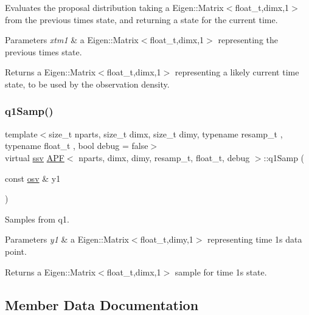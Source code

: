 Evaluates the proposal distribution taking a Eigen\+::\+Matrix$<$float\+\_\+t,dimx,1$>$ from the previous time\textquotesingle{}s state, and returning a state for the current time. 


\begin{DoxyParams}{Parameters}
{\em xtm1} & a Eigen\+::\+Matrix$<$float\+\_\+t,dimx,1$>$ representing the previous time\textquotesingle{}s state. \\
\hline
\end{DoxyParams}
\begin{DoxyReturn}{Returns}
a Eigen\+::\+Matrix$<$float\+\_\+t,dimx,1$>$ representing a likely current time state, to be used by the observation density. 
\end{DoxyReturn}
\mbox{\label{classAPF_ab50c4cc94c46502910c133d0ff0397f6}} 
\subsubsection{\texorpdfstring{q1\+Samp()}{q1Samp()}}
{\footnotesize\ttfamily template$<$size\+\_\+t nparts, size\+\_\+t dimx, size\+\_\+t dimy, typename resamp\+\_\+t , typename float\+\_\+t , bool debug = false$>$ \\
virtual \hyperlink{classAPF_a8b170471292cd6fb5c3c19b55b42fc4e}{ssv} \hyperlink{classAPF}{A\+PF}$<$ nparts, dimx, dimy, resamp\+\_\+t, float\+\_\+t, debug $>$\+::q1\+Samp (\begin{DoxyParamCaption}\item[{const \hyperlink{classAPF_ae4887b3f7121a7509397dd00bffedfe0}{osv} \&}]{y1 }\end{DoxyParamCaption})\hspace{0.3cm}{\ttfamily [pure virtual]}}



Samples from q1. 


\begin{DoxyParams}{Parameters}
{\em y1} & a Eigen\+::\+Matrix$<$float\+\_\+t,dimy,1$>$ representing time 1\textquotesingle{}s data point. \\
\hline
\end{DoxyParams}
\begin{DoxyReturn}{Returns}
a Eigen\+::\+Matrix$<$float\+\_\+t,dimx,1$>$ sample for time 1\textquotesingle{}s state. 
\end{DoxyReturn}


\subsection{Member Data Documentation}
\mbox{\label{classAPF_a3cc77adc62c7de8ddbdee9240701dc78}} 
